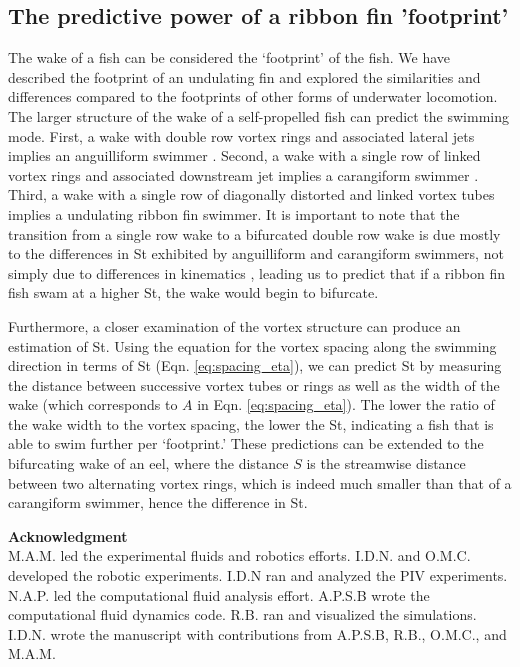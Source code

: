 \documentclass[onecolumn]{IEEEtran}
\begin{document}
\subsection{The predictive power of a ribbon fin 'footprint'}

The wake of a fish can be considered the `footprint' of the fish. We
have described the footprint of an undulating fin and explored the
similarities and differences compared to the footprints of other forms of
underwater locomotion. The larger structure of the wake of a self-propelled fish can predict
the swimming mode. First, a wake with double row vortex rings and
associated lateral jets implies an anguilliform swimmer
\citep*{Tyte04a,Kern06a}. Second, a wake with a single row of linked
vortex rings and associated downstream jet implies a carangiform swimmer
\citep*{Naue02b}. Third, a wake with a single row of diagonally distorted and linked
vortex tubes implies a undulating ribbon fin swimmer. It is important to
note that the transition from a single row wake to a bifurcated double row
wake is due mostly to the differences in St exhibited by anguilliform and
carangiform swimmers, not simply due to differences in kinematics
\citep*{Tyte10a}, leading us to predict that if a ribbon fin fish swam at
a higher St, the wake would begin to bifurcate.

Furthermore, a closer examination of the vortex structure can produce an
estimation of St. Using the equation for the vortex spacing along the
swimming direction in terms of St (Eqn. \ref{eq:spacing_eta}), we can
predict St by measuring the distance between successive vortex tubes or
rings as well as the width of the wake (which corresponds to $A$ in 
Eqn. \ref{eq:spacing_eta}). The lower the ratio of the wake width to the vortex spacing,
the lower the St, indicating a fish that is able to swim further per
`footprint.' These predictions can be extended to the bifurcating wake of
an eel, where the distance $S$ is the streamwise distance between two
alternating vortex rings, which is indeed much smaller than that of a
carangiform swimmer, hence the difference in St.




\noindent
\textbf{Acknowledgment}\\

M.A.M. led the experimental fluids and robotics efforts.  I.D.N. and O.M.C. developed the robotic experiments.  I.D.N ran and analyzed the PIV experiments. N.A.P. led the computational fluid analysis effort.  A.P.S.B wrote the computational fluid dynamics code.  R.B. ran and visualized the simulations.   I.D.N. wrote the manuscript with contributions from A.P.S.B, R.B.,  O.M.C., and M.A.M.
\end{document}
